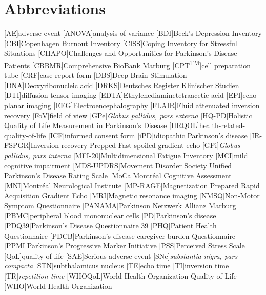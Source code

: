 \chapter*{Abbreviations}
\let\oldbaselinestretch=\baselinestretch%
\renewcommand{\baselinestretch}{1}%
\large\normalsize%
\thispagestyle{plain}
\begin{multicols}{2}
\begin{acronym}
\setlength{\parskip}{0ex}
[AE]{adverse event}
[ANOVA]{analysis of variance}
[BDI]{Beck's Depression Inventory}
[CBI]{Copenhagen Burnout Inventory}
[CISS]{Coping Inventory for Stressful Situations}
[CHAPO]{Challenges and Opportunities for Parkinson's Disease Patients}
[CBBMR]{Comprehensive BioBank Marburg}
[CPT\textsuperscript{TM}]{cell preparation tube}
[CRF]{case report form}
[DBS]{Deep Brain Stimulation}
[DNA]{Deoxyribonucleic acid}
[DRKS]{Deutsches Register Klinischer Studien}
[DTI]{diffusion tensor imaging}
[EDTA]{Ethylenediaminetetraacetic acid}
[EPI]{echo planar imaging}
[EEG]{Electroencephalography}
[FLAIR]{Fluid attenuated inversion recovery}
[FoV]{field of view}
[GPe]{\textit{Globus pallidus, pars externa}}
[HQ-PD]{Holistic Quality of Life Measurement in Parkinson's Disease}
[HRQOL]{health-related-quality-of-life}
[ICF]{informed consent form}
[iPD]{idiopathic Parkinson's disease}
[IR-FSPGR]{Inversion-recovery Prepped Fast-spoiled-gradient-echo}
[GPi]{\textit{Globus pallidus, pars interna}}
[MFI-20]{Multidimensional Fatigue Inventory}
[MCI]{mild cognitive impairment}
[MDS-UPDRS]{Movement Disorder Society Unified Parkinson's Disease Rating Scale}
[MoCa]{Montréal Cognitive Assessment}
[MNI]{Montréal Neurological Institute}
[MP-RAGE]{Magnetization Prepared Rapid Acquisition Gradient Echo}
[MRI]{Magnetic resonance imaging}
[NMSQ]{Non-Motor Symptom Questionnaire}
[PANAMA]{Parkinson Netzwerk Allianz Marburg}
[PBMC]{peripheral blood mononuclear cells}
[PD]{Parkinson's disease}
[PDQ39]{Parkinson's Disease Questionnaire 39}
[PHQ]{Patient Health Questionnaire}
[PDCB]{Parkinson’s disease caregiver burden Questionnaire}
[PPMI]{Parkinson's Progressive Marker Initiative}
[PSS]{Perceived Stress Scale}
[QoL]{quality-of-life}
[SAE]{Serious adverse event}
[SNc]{\textit{substantia nigra, pars compacta}}
[STN]{subthalamicus nucleus}
[TE]{echo time}
[TI]{inversion time}
[TR]{\textit{repetition time}}
[WHOQoL]{World Health Organization Quality of Life}
[WHO]{World Health Organization}
\end{acronym}
\renewcommand{\baselinestretch}{\oldbaselinestretch}%
\large\normalsize%
\end{multicols}
